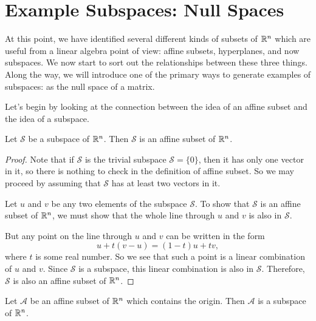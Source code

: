 \documentclass[elementsmain.tex]{subfiles}
\begin{document}
\section{Example Subspaces: Null Spaces}

At this point, we have identified several different kinds of subsets of $\mathbb{R}^n$ which are useful from a linear algebra point of view: affine subsets, hyperplanes, and now subspaces. We now start to sort out the relationships between these three things. Along the way, we will introduce one of the primary ways to generate examples of subspaces: as the null space of a matrix.

Let's begin by looking at the connection between the idea of an affine subset and the idea of a subspace.

\begin{theorem} Let $\mathcal{S}$ be a subspace of $\mathbb{R}^n$. Then $\mathcal{S}$ is an affine subset of $\mathbb{R}^n$.
\end{theorem}

\begin{proof}
Note that if $\mathcal{S}$ is the trivial subspace $\mathcal{S}= \{0\}$, then it has only one vector in it, so there is nothing to check in the definition of affine subset. So we may proceed by assuming that $\mathcal{S}$ has at least two vectors in it.

Let $u$ and $v$ be any two elements of the subspace $\mathcal{S}$. To show that $\mathcal{S}$ is an affine subset of $\mathbb{R}^n$, we must show that the whole line through $u$ and $v$ is also in $\mathcal{S}$.

But any point on the line through $u$ and $v$ can be written in the form 
\[
u + t(v-u) = (1-t) u + t v,
\]
where $t$ is some real number. So we see that such a point is a linear combination of $u$ and $v$. Since $\mathcal{S}$ is a subspace, this linear combination is also in $\mathcal{S}$. Therefore, $\mathcal{S}$ is also an affine subset of $\mathbb{R}^n$.
\end{proof}


\begin{theorem}\label{thm:13-2} Let $\mathcal{A}$ be an affine subset of $\mathbb{R}^n$ which contains the origin. Then $\mathcal{A}$ is a subspace of $\mathbb{R}^n$.
\end{theorem}
\end{document}
